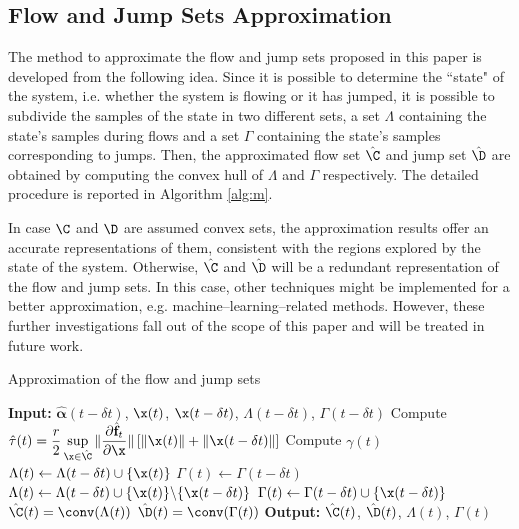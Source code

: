 \subsection{Flow and Jump Sets Approximation}
The method to approximate the flow and jump sets proposed in this paper is developed from the following idea. Since it is possible to determine the ``state" of the system, i.e.  whether the system is flowing or it has jumped, it is possible to subdivide the samples of the state in two different sets, a set $\Lambda$ containing the state's samples during flows and a set $\Gamma$ containing the state's samples corresponding to jumps. Then, the approximated flow set $\hat{\C}$ and jump set $\hat{\D}$ are obtained by computing the convex hull of $\Lambda$ and $\Gamma$ respectively. The detailed procedure is reported in Algorithm \ref{alg:m}.%
{%
\begin{rem}
In case $\C$ and $\D$ are assumed convex sets, the approximation results offer an accurate representations of them, consistent with the regions explored by the state of the system. Otherwise, $\hat{\C}$ and $\hat{\D}$ will be a redundant representation of the flow and jump sets. In this case, other techniques might be implemented for a better approximation, e.g. machine--learning--related methods. However, these further investigations fall out of the scope of this paper and will be treated in future work.
\end{rem}
}
\begin{algorithm}[!t]
	\caption{Approximation of the flow and jump sets}\label{alg:m}
	\begin{algorithmic}[1]
		\State \textbf{Input:} $\hat{\bm{\alpha}}(t-\delta t)$, $\x(t)$, $\x(t-\delta t)$, $\Lambda(t-\delta t)$, $\Gamma(t-\delta t)$
		\State Compute $\hat{\tau}(t)=\dfrac{r}{2}\sup\limits_{\x\in\hat{\C}}\|\dfrac{\partial \hat{\mathbf{f}}_t}{\partial\x}\|\left[\|\x(t)\|+\|\x(t-\delta t)\|\right]$
		\State Compute $\gamma(t)$
		\State $\Lambda(t)\gets\Lambda(t-\delta t)\cup\{\x(t)\}$
		\State $\Gamma(t)\gets\Gamma(t-\delta t)$
		\Else
		\State $\Lambda(t)\gets\Lambda(t-\delta t)\cup\{\x(t)\}\backslash\{\x(t-\delta t)\}$
		\State $\Gamma(t)\gets\Gamma(t-\delta t)\cup\{\x(t-\delta t)\}$
		\EndIf
		\State $\hat{\C}(t) = \conv(\Lambda(t))$
        \State $\hat{\D}(t)=\conv(\Gamma(t))$
		\State \textbf{Output:} $\hat{\C}(t)$, $\hat{\D}(t)$, $\Lambda(t)$, $\Gamma(t)$
		\vspace{-5mm}
	\end{algorithmic}
	\vspace{5mm}
\end{algorithm}

